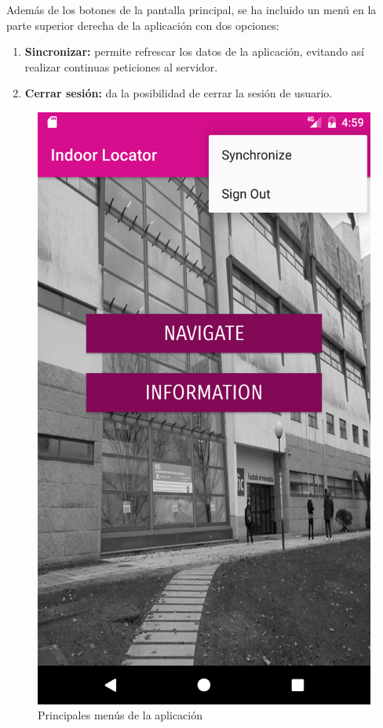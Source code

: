 \documentclass[12pt, a4paper, titlepage]{article}
\begin{document}
	Además de los botones de la pantalla principal, se ha incluido un menú en la parte superior derecha de la aplicación con dos opciones:
	\begin{enumerate}
		\item \textbf{Sincronizar:} permite refrescar los datos de la aplicación, evitando así realizar continuas peticiones al servidor.
		\item \textbf{Cerrar sesión:} da la posibilidad de cerrar la sesión de usuario.
	\end{enumerate}
	
	\begin{figure}[h!]
		\begin{center}
			\includegraphics[scale=0.15]{img/menu_sincronizar.png}
			\caption{Principales menús de la aplicación}
		\end{center}
	\end{figure}
	\clearpage
\end{document}
